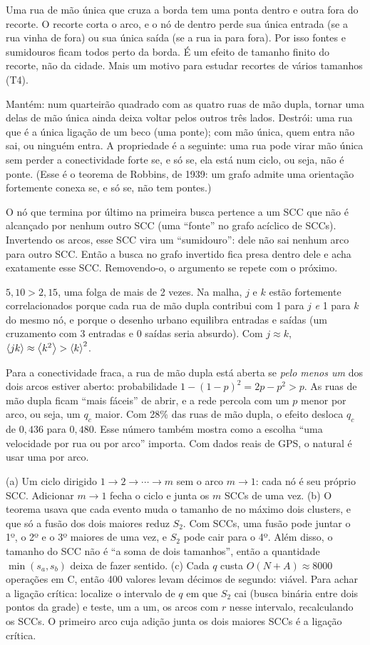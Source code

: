 \documentclass[11pt]{article}
\begin{document}
\solucoes

Uma rua de mão única que cruza a borda tem uma ponta dentro e outra fora do recorte. O recorte corta o arco, e o nó de dentro perde sua única entrada (se a rua vinha de fora) ou sua única saída (se a rua ia para fora). Por isso fontes e sumidouros ficam todos perto da borda. É um efeito de tamanho finito do recorte, não da cidade. Mais um motivo para estudar recortes de vários tamanhos (T4).

Mantém: num quarteirão quadrado com as quatro ruas de mão dupla, tornar uma delas de mão única ainda deixa voltar pelos outros três lados. Destrói: uma rua que é a única ligação de um beco (uma ponte); com mão única, quem entra não sai, ou ninguém entra. A propriedade é a seguinte: uma rua pode virar mão única sem perder a conectividade forte se, e só se, ela está num ciclo, ou seja, não é ponte. (Esse é o teorema de Robbins, de 1939: um grafo admite uma orientação fortemente conexa se, e só se, não tem pontes.)

O nó que termina por último na primeira busca pertence a um SCC que não é alcançado por nenhum outro SCC (uma ``fonte'' no grafo acíclico de SCCs). Invertendo os arcos, esse SCC vira um ``sumidouro'': dele não sai nenhum arco para outro SCC. Então a busca no grafo invertido fica presa dentro dele e acha exatamente esse SCC. Removendo-o, o argumento se repete com o próximo.

$5{,}10>2{,}15$, uma folga de mais de 2 vezes. Na malha, $j$ e $k$ estão fortemente correlacionados porque cada rua de mão dupla contribui com 1 para $j$ \emph{e} 1 para $k$ do mesmo nó, e porque o desenho urbano equilibra entradas e saídas (um cruzamento com 3 entradas e 0 saídas seria absurdo). Com $j\approx k$, $\left\langle jk \right\rangle\approx\left\langle k^2 \right\rangle>\left\langle k \right\rangle^2$.

Para a conectividade fraca, a rua de mão dupla está aberta se \emph{pelo menos um} dos dois arcos estiver aberto: probabilidade $1-(1-p)^2 = 2p-p^2>p$. As ruas de mão dupla ficam ``mais fáceis'' de abrir, e a rede percola com um $p$ menor por arco, ou seja, um $q_c$ maior. Com 28\% das ruas de mão dupla, o efeito desloca $q_c$ de $0{,}436$ para $0{,}480$. Esse número também mostra como a escolha ``uma velocidade por rua ou por arco'' importa. Com dados reais de GPS, o natural é usar uma por arco.

(a) Um ciclo dirigido $1\to2\to\cdots\to m$ sem o arco $m\to1$: cada nó é seu próprio SCC. Adicionar $m\to1$ fecha o ciclo e junta os $m$ SCCs de uma vez. (b) O teorema usava que cada evento muda o tamanho de no máximo dois clusters, e que só a fusão dos dois maiores reduz $S_2$. Com SCCs, uma fusão pode juntar o 1º, o 2º e o 3º maiores de uma vez, e $S_2$ pode cair para o 4º. Além disso, o tamanho do SCC não é ``a soma de dois tamanhos'', então a quantidade $\min(s_a,s_b)$ deixa de fazer sentido. (c) Cada $q$ custa $O(N+A)\approx8000$ operações em C, então 400 valores levam décimos de segundo: viável. Para achar a ligação crítica: localize o intervalo de $q$ em que $S_2$ cai (busca binária entre dois pontos da grade) e teste, um a um, os arcos com $r$ nesse intervalo, recalculando os SCCs. O primeiro arco cuja adição junta os dois maiores SCCs é a ligação crítica.
\end{document}
